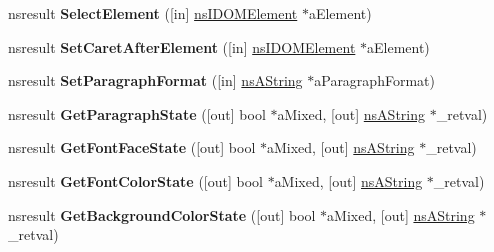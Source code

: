 \begin{DoxyCompactItemize}
\mbox{\label{interfacens_i_h_t_m_l_editor_a15938e7692c0e8452755cf66e8a371aa}} 
nsresult {\bfseries Select\+Element} (\mbox{[}in\mbox{]} \hyperlink{interfacens_i_d_o_m_element}{ns\+I\+D\+O\+M\+Element} $\ast$a\+Element)
\item 
\mbox{\label{interfacens_i_h_t_m_l_editor_a0c77b1a344b53f31b4e6f7626bc88e1b}} 
nsresult {\bfseries Set\+Caret\+After\+Element} (\mbox{[}in\mbox{]} \hyperlink{interfacens_i_d_o_m_element}{ns\+I\+D\+O\+M\+Element} $\ast$a\+Element)
\item 
\mbox{\label{interfacens_i_h_t_m_l_editor_a466a501b979b92de9946932d0b2da901}} 
nsresult {\bfseries Set\+Paragraph\+Format} (\mbox{[}in\mbox{]} \hyperlink{structns_string_container}{ns\+A\+String} $\ast$a\+Paragraph\+Format)
\item 
\mbox{\label{interfacens_i_h_t_m_l_editor_aec1ef166ad04ca0c7499cd622998f529}} 
nsresult {\bfseries Get\+Paragraph\+State} (\mbox{[}out\mbox{]} bool $\ast$a\+Mixed, \mbox{[}out\mbox{]} \hyperlink{structns_string_container}{ns\+A\+String} $\ast$\+\_\+retval)
\item 
\mbox{\label{interfacens_i_h_t_m_l_editor_a5c17ab75742a832cd0cfb7ef01b90bdd}} 
nsresult {\bfseries Get\+Font\+Face\+State} (\mbox{[}out\mbox{]} bool $\ast$a\+Mixed, \mbox{[}out\mbox{]} \hyperlink{structns_string_container}{ns\+A\+String} $\ast$\+\_\+retval)
\item 
\mbox{\label{interfacens_i_h_t_m_l_editor_a52b015e7223509129db36deeabc8604d}} 
nsresult {\bfseries Get\+Font\+Color\+State} (\mbox{[}out\mbox{]} bool $\ast$a\+Mixed, \mbox{[}out\mbox{]} \hyperlink{structns_string_container}{ns\+A\+String} $\ast$\+\_\+retval)
\item 
\mbox{\label{interfacens_i_h_t_m_l_editor_ad8700f3bbdc08a467d1015c09ae456db}} 
nsresult {\bfseries Get\+Background\+Color\+State} (\mbox{[}out\mbox{]} bool $\ast$a\+Mixed, \mbox{[}out\mbox{]} \hyperlink{structns_string_container}{ns\+A\+String} $\ast$\+\_\+retval)
\item 
\mbox{\label{interfacens_i_h_t_m_l_editor_af292f9bfc7e345ae2ba0a5089b5295d6}} 

\end{DoxyCompactItemize}
